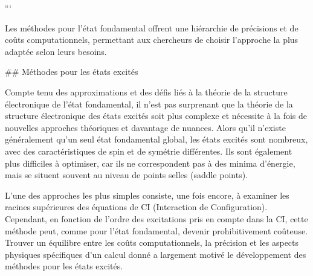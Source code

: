 \documentclass[12pt,a4paper]{report}
\begin{document}
\begin{markdown}

```

Les méthodes pour l’état fondamental offrent une hiérarchie de précisions et de coûts computationnels, permettant aux chercheurs de choisir l’approche la plus adaptée selon leurs besoins. 


##  Méthodes pour les états excités

Compte tenu des approximations et des défis liés à la théorie de la structure électronique de l'état fondamental, il n'est pas surprenant que la théorie de la structure électronique des états excités soit plus complexe et nécessite à la fois de nouvelles approches théoriques et davantage de nuances. Alors qu'il n'existe généralement qu'un seul état fondamental global, les états excités sont nombreux, avec des caractéristiques de spin et de symétrie différentes. Ils sont également plus difficiles à optimiser, car ils ne correspondent pas à des minima d'énergie, mais se situent souvent au niveau de points selles (saddle points). 

L'une des approches les plus simples consiste, une fois encore, à examiner les racines supérieures des équations de CI (Interaction de Configuration). Cependant, en fonction de l'ordre des excitations pris en compte dans la CI, cette méthode peut, comme pour l'état fondamental, devenir prohibitivement coûteuse. Trouver un équilibre entre les coûts computationnels, la précision et les aspects physiques spécifiques d'un calcul donné a largement motivé le développement des méthodes pour les états excités. 


\end{markdown}
\end{document}
